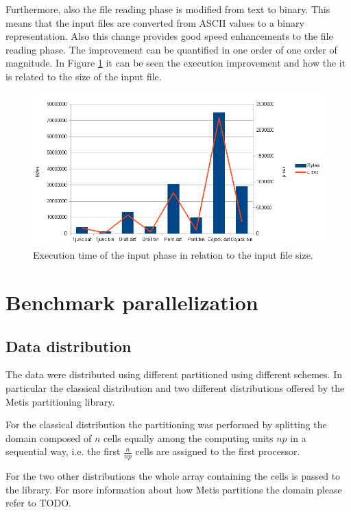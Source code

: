 \documentclass[12pt, a4paper]{article}
\begin{document}
Furthermore, also the file reading phase is modified from text to binary. This 
means that the input files are converted from ASCII values to a binary 
representation.
Also this change provides good speed enhancements to the file reading phase. 
The improvement can be quantified in one order of one order of magnitude. In
Figure \ref{fig:io} it can be seen the execution improvement and how the
it is related to the size of the input file.
\begin{figure}[h]
  \begin{centering}
    \includegraphics[width=1\textwidth]{figures/io.png}
    \par\end{centering}
  \caption{
    Execution time of the input phase in relation to the input file size. 
    \label{fig:io}
  }
\end{figure}

\section{Benchmark parallelization}

  \subsection*{Data distribution}
  The data were distributed using different partitioned using different schemes.
  In particular the classical distribution and two different distributions
  offered by the Metis partitioning library.

  For the classical distribution the partitioning was performed by splitting the
  domain composed of $n$ cells equally among the computing units $np$ in a
  sequential way, i.e. the first $ \frac{n}{np} $ cells are assigned to the
  first processor.

  For the two other distributions the whole array containing the cells is passed
  to the library. For more information about how Metis partitions the domain
  please refer to TODO.
\end{document}
